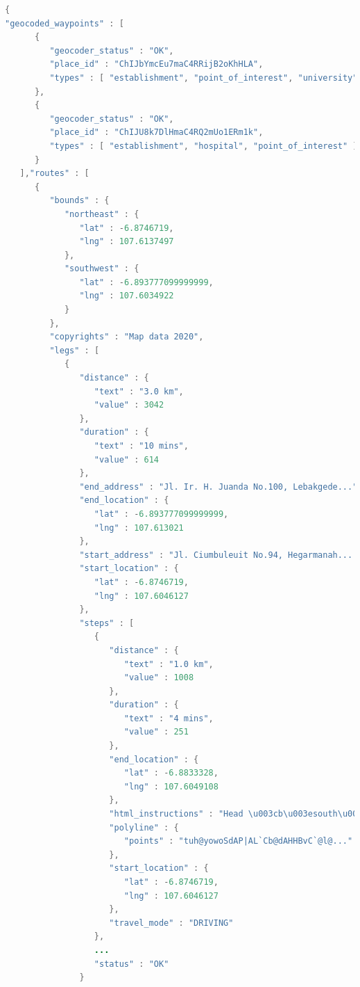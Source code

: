 \begin{lstlisting}[caption={Hasil Pemanggilan \textit{Directions API} yang Berhasil},label={list:success_directions},language=java]
{
"geocoded_waypoints" : [
      {
         "geocoder_status" : "OK",
         "place_id" : "ChIJbYmcEu7maC4RRijB2oKhHLA",
         "types" : [ "establishment", "point_of_interest", "university" ]
      },
      {
         "geocoder_status" : "OK",
         "place_id" : "ChIJU8k7DlHmaC4RQ2mUo1ERm1k",
         "types" : [ "establishment", "hospital", "point_of_interest" ]
      }
   ],"routes" : [
      {
         "bounds" : {
            "northeast" : {
               "lat" : -6.8746719,
               "lng" : 107.6137497
            },
            "southwest" : {
               "lat" : -6.893777099999999,
               "lng" : 107.6034922
            }
         },
         "copyrights" : "Map data 2020",
         "legs" : [
            {
               "distance" : {
                  "text" : "3.0 km",
                  "value" : 3042
               },
               "duration" : {
                  "text" : "10 mins",
                  "value" : 614
               },
               "end_address" : "Jl. Ir. H. Juanda No.100, Lebakgede...",
               "end_location" : {
                  "lat" : -6.893777099999999,
                  "lng" : 107.613021
               },
               "start_address" : "Jl. Ciumbuleuit No.94, Hegarmanah....",
               "start_location" : {
                  "lat" : -6.8746719,
                  "lng" : 107.6046127
               },
               "steps" : [
                  {
                     "distance" : {
                        "text" : "1.0 km",
                        "value" : 1008
                     },
                     "duration" : {
                        "text" : "4 mins",
                        "value" : 251
                     },
                     "end_location" : {
                        "lat" : -6.8833328,
                        "lng" : 107.6049108
                     },
                     "html_instructions" : "Head \u003cb\u003esouth\u003c...",
                     "polyline" : {
                        "points" : "tuh@yowoSdAP|AL`Cb@dAHHBvC`@l@..."
                     },
                     "start_location" : {
                        "lat" : -6.8746719,
                        "lng" : 107.6046127
                     },
                     "travel_mode" : "DRIVING"
                  },
                  ...
                  "status" : "OK"
               }
\end{lstlisting}



